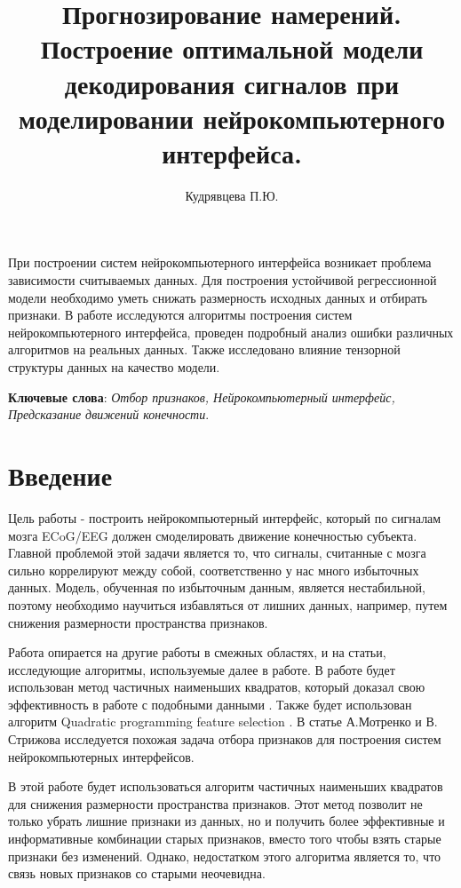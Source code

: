 \documentclass[12pt,twoside]{article}
\title
    {Прогнозирование намерений. Построение оптимальной модели декодирования сигналов при моделировании нейрокомпьютерного интерфейса.}
\author {Кудрявцева П.Ю.} %
\begin{document}
\maketitle

\abstract
    {При построении систем нейрокомпьютерного интерфейса возникает проблема зависимости считываемых данных. Для построения устойчивой регрессионной модели необходимо уметь снижать размерность исходных данных и отбирать признаки. В работе исследуются алгоритмы построения систем нейрокомпьютерного интерфейса, проведен подробный анализ ошибки различных алгоритмов на реальных данных. Также исследовано влияние тензорной структуры данных на качество модели.

\bigskip
\textbf{Ключевые слова}: \emph {Отбор признаков, Нейрокомпьютерный интерфейс, Предсказание движений конечности}.}
\section{Введение}
 Цель работы - построить нейрокомпьютерный интерфейс, который по сигналам мозга ECoG/EEG должен смоделировать движение конечностью субъекта. Главной проблемой этой задачи является то, что сигналы, считанные с мозга сильно коррелируют между собой, соответственно у нас много избыточных данных. Модель, обученная по избыточным данным, является нестабильной, поэтому необходимо научиться избавляться от лишних данных, например, путем снижения размерности пространства признаков. 
 
 Работа опирается на другие работы в смежных областях, и на статьи, исследующие алгоритмы, используемые далее в работе. В работе будет использован метод частичных наименьших квадратов, который доказал свою эффективность в работе с подобными данными \cite{pls_effective}. Также будет использован алгоритм Quadratic programming feature selection \cite{qpfc}. В статье А.Мотренко и В. Стрижова \cite{motrenko} исследуется похожая задача отбора признаков для построения систем нейрокомпьютерных интерфейсов. 
 
 В этой работе будет использоваться алгоритм частичных наименьших квадратов для снижения размерности пространства признаков. Этот метод позволит не только убрать лишние признаки из данных, но и получить более эффективные и информативные комбинации старых признаков, вместо того чтобы взять старые признаки без изменений. Однако, недостатком этого алгоритма является то, что связь новых признаков со старыми неочевидна. 


{}

\end{document}
